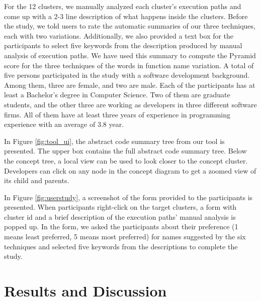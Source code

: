 For the 12 clusters, we manually analyzed each cluster's execution paths and come up with a 2-3 line description of what happens inside the clusters. Before the study, we told users to rate the automatic summaries of our three techniques, each with two variations. Additionally, we also provided a text box for the participants to select five keywords from the description produced by manual analysis of execution paths. We have used this summary to compute the Pyramid score for the three techniques of the words in function name variation. A total of five persons participated in the study with a software development background. Among them, three are female, and two are male. Each of the participants has at least a Bachelor's degree in Computer Science. Two of them are graduate students, and the other three are working as developers in three different software firms. All of them have at least three years of experience in programming experience with an average of 3.8 year. 


In Figure \ref{fig:tool_ui}, the abstract code summary tree from our tool is presented. The upper box contains the full abstract code summary tree. Below the concept tree, a local view can be used to look closer to the concept cluster. Developers can click on any node in the concept diagram to get a zoomed view of its child and parents. 

In Figure \ref{fig:userstudy}, a screenshot of the form provided to the participants is presented. When participants right-click on the target clusters, a form with cluster id and a brief description of the execution paths' manual analysis is popped up. In the form, we asked the participants about their preference (1 means least preferred, 5 means most preferred) for names suggested by the six techniques and selected five keywords from the descriptions to complete the study.


\section{Results and Discussion}
\label{results}

